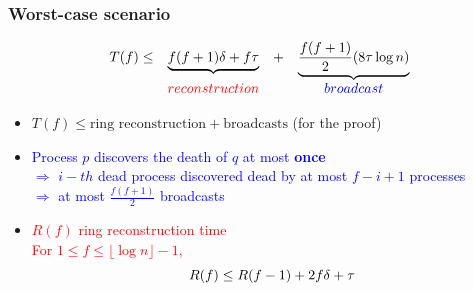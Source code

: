 \begin{frame}
\frametitle{Worst-case scenario}

$$\begin{array}{cccc}
T(f) \leq  & \underbrace{f(f+1)  \delta  +   f \tau}  & + &  \underbrace{\frac{f(f+1)}{2}(8 \tau \log n)}\\
& \textcolor{red}{reconstruction} & & \textcolor{blue}{broadcast}
\end{array}$$

\begin{itemize}
\item $T(f) \leq  \text{ring reconstruction} + \text{broadcasts}$ (for the proof)
\item \textcolor{blue}{Process $p$ discovers the death of $q$ at most \textbf{once}\\
$\Rightarrow$ $i-th$ dead process discovered dead by at most $f-i+1$ processes\\
$\Rightarrow$ at most $\frac{f(f+1)}{2}$ broadcasts}
\item \textcolor{red}{$R(f)$ ring reconstruction time\\
For $ 1 \leq f \leq \lfloor \log n \rfloor -1$,
$$R(f) \leq  R(f-1) + 2f  \delta + \tau$$}
\end{itemize}
\end{frame}

